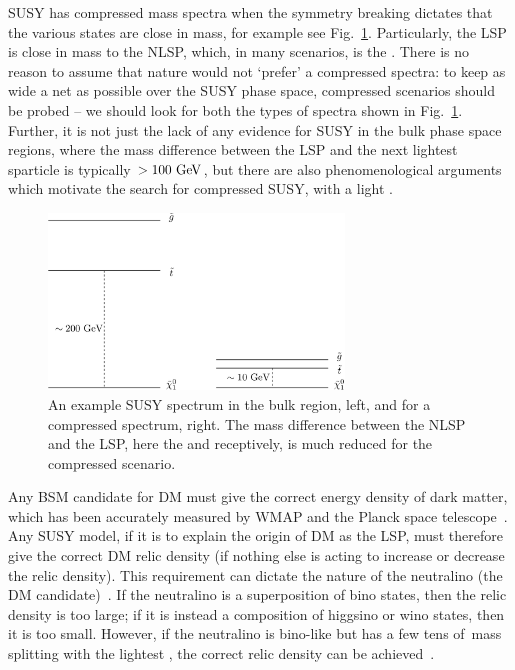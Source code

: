 \ac{SUSY} has compressed mass spectra when the symmetry breaking dictates that the various states are close in mass, for example see Fig.~\ref{fig:compSUSYspec}. 
Particularly, the \ac{LSP} is close in mass to the \ac{NLSP}, which, 
in many scenarios, is the \sTop{}. 
There is no reason to assume that nature would not `prefer' a compressed spectra: to keep as wide a net as possible over the \ac{SUSY} phase space, compressed scenarios should be probed -- we should look for both the types of spectra shown in Fig.~\ref{fig:compSUSYspec}.
Further, it is not just the lack of any evidence for \ac{SUSY} in the bulk phase space regions, 
where the mass difference between the \ac{LSP} and the next lightest sparticle is typically $>100~\mathrm{GeV}$, 
but there are also phenomenological arguments which motivate the search for compressed \ac{SUSY}, with a light \sTop.
%
\begin{figure}[t!]
  \begin{center}
  \includegraphics[width=0.7\textwidth]{Figures/theory/susyCompressedSpectra.pdf}
  \caption{An example \ac{SUSY} spectrum in the bulk region, left, and for a compressed spectrum, right. The mass difference between the \ac{NLSP} and the \ac{LSP}, here the \sTop{} and \chiOneZero receptively, is much reduced for the compressed scenario.}
  \label{fig:compSUSYspec}
  \end{center}
\end{figure}

Any \ac{BSM} candidate for \ac{DM} must give the correct energy density of dark matter, which has been accurately measured by \ac{WMAP} and the Planck space telescope~\cite{WMAP2003,Planck2013}.
Any \ac{SUSY} model, if it is to explain the origin of \ac{DM} as the \ac{LSP}, must therefore give the correct \ac{DM} relic density (if nothing else is acting to increase or decrease the relic density). 
This requirement can dictate the nature of the neutralino (the \ac{DM} candidate)~\cite{CompSUSY1,CompSUSY2}.
If the neutralino is a superposition of bino states, then the relic density is too large; if it is instead a composition of higgsino or wino states, then it is too small.
However, if the neutralino is bino-like but has a few tens of~\GeV mass splitting with the lightest \sTop{}, the correct relic density can be achieved~\cite{CompSUSY6,CompSUSY9,CompSUSY10}.

